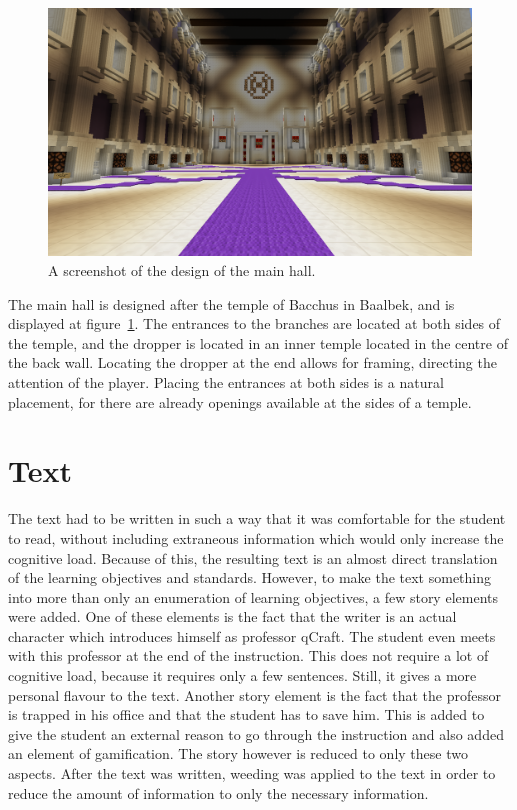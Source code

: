 \documentclass[11pt,twoside]{report} %
\begin{document}
\begin{figure}[h]
\centering
\includegraphics[width=\textwidth]{mainhall}
\caption{A screenshot of the design of the main hall.\label{fig:mainhall}}
\end{figure}

The main hall is designed after the temple of Bacchus in Baalbek, and is displayed at figure~\ref{fig:mainhall}. The entrances to the branches are located at both sides of the temple, and the dropper is located in an inner temple located in the centre of the back wall. Locating the dropper at the end allows for framing, directing the attention of the player. Placing the entrances at both sides is a natural placement, for there are already openings available at the sides of a temple.

\section{Text}
\label{sec:devtext}

The text had to be written in such a way that it was comfortable for the student to read, without including extraneous information which would only increase the cognitive load. Because of this, the resulting text is an almost direct translation of the learning objectives and standards. However, to make the text something into more than only an enumeration of learning objectives, a few story elements were added. One of these elements is the fact that the writer is an actual character which introduces himself as professor qCraft. The student even meets with this professor at the end of the instruction. This does not require a lot of cognitive load, because it requires only a few sentences. Still, it gives a more personal flavour to the text. Another story element is the fact that the professor is trapped in his office and that the student has to save him. This is added to give the student an external reason to go through the instruction and also added an element of gamification. The story however is reduced to only these two aspects. After the text was written, weeding was applied to the text in order to reduce the amount of information to only the necessary information.
\end{document}
